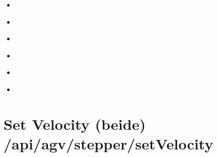 \documentclass[letterpaper,10pt,english]{sphinxmanual}
\begin{document}
\begin{itemize}
\item {} 
\sphinxAtStartPar
{\hyperref[\detokenize{agv_rest_api_stepper:get-api-agv-stepper-getcurrentposition}]{}}

\item {} 
\sphinxAtStartPar
{\hyperref[\detokenize{agv_rest_api_stepper:post-api-agv-stepper-setvelocitysingle}]{}}

\item {} 
\sphinxAtStartPar
{\hyperref[\detokenize{agv_rest_api_stepper:post-api-agv-stepper-setmaxvelocityperc}]{}}

\item {} 
\sphinxAtStartPar
{\hyperref[\detokenize{agv_rest_api_stepper:post-api-agv-stepper-setmaxaccelerationperc}]{}}

\item {} 
\sphinxAtStartPar
{\hyperref[\detokenize{agv_rest_api_stepper:post-api-agv-stepper-setmoveabsolute}]{}}

\item {} 
\sphinxAtStartPar
{\hyperref[\detokenize{agv_rest_api_stepper:post-api-agv-stepper-setmoverelative}]{}}

\end{itemize}


\section{Set Velocity (beide) \textendash{} /api/agv/stepper/setVelocity}
\label{\detokenize{agv_rest_api_stepper:set-velocity-beide-api-agv-stepper-setvelocity}}\label{\detokenize{agv_rest_api_stepper:post-api-agv-stepper-setvelocity}}
\end{document}
